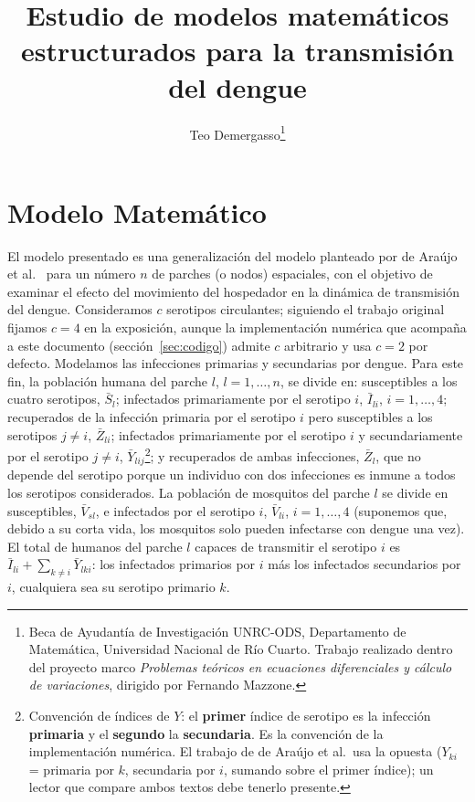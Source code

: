 \documentclass{article}
\numberwithin{equation}{section}
\begin{document}
	\title{Estudio de modelos matemáticos estructurados para la transmisión del dengue}
	\date{}
	\author{Teo Demergasso\thanks{Beca de Ayudantía de Investigación UNRC-ODS, Departamento de Matemática, Universidad Nacional de Río Cuarto. Trabajo realizado dentro del proyecto marco \emph{Problemas teóricos en ecuaciones diferenciales y cálculo de variaciones}, dirigido por Fernando Mazzone.}}

\maketitle

\section{Modelo Matemático}
El modelo presentado es una generalización del modelo planteado por de Araújo et al.~\cite{deAraujo2023} para un número $n$ de parches (o nodos) espaciales, con el objetivo de examinar el efecto del movimiento del hospedador en la dinámica de transmisión del dengue. Consideramos $c$ serotipos circulantes; siguiendo el trabajo original fijamos $c=4$ en la exposición, aunque la implementación numérica que acompaña a este documento (sección~\ref{sec:codigo}) admite $c$ arbitrario y usa $c=2$ por defecto. Modelamos las infecciones primarias y secundarias por dengue. Para este fin, la población humana del parche $l$, $l=1,\dots,n$, se divide en: susceptibles a los cuatro serotipos, $\bar S_l$; infectados primariamente por el serotipo $i$, $\bar I_{li}$, $i=1,\dots,4$; recuperados de la infección primaria por el serotipo $i$ pero susceptibles a los serotipos $j\neq i$, $\bar Z_{li}$; infectados primariamente por el serotipo $i$ y secundariamente por el serotipo $j\neq i$, $\bar Y_{lij}$\footnote{Convención de índices de $Y$: el \textbf{primer} índice de serotipo es la infección \textbf{primaria} y el \textbf{segundo} la \textbf{secundaria}. Es la convención de la implementación numérica. El trabajo de de Araújo et al.\ usa la opuesta ($Y_{ki}$ = primaria por $k$, secundaria por $i$, sumando sobre el primer índice); un lector que compare ambos textos debe tenerlo presente.}; y recuperados de ambas infecciones, $\bar Z_l$, que no depende del serotipo porque un individuo con dos infecciones es inmune a todos los serotipos considerados. La población de mosquitos del parche $l$ se divide en susceptibles, $\bar V_{sl}$, e infectados por el serotipo $i$, $\bar V_{li}$, $i=1,\dots,4$ (suponemos que, debido a su corta vida, los mosquitos solo pueden infectarse con dengue una vez). El total de humanos del parche $l$ capaces de transmitir el serotipo $i$ es $\bar I_{li}+\sum_{k\neq i}\bar Y_{lki}$: los infectados primarios por $i$ más los infectados secundarios por $i$, cualquiera sea su serotipo primario $k$.
\end{document}
